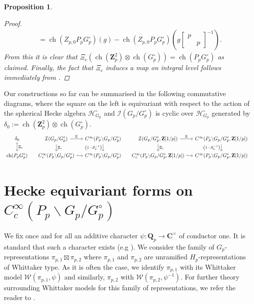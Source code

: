 \documentclass{amsart}%
\theoremstyle{plain}
\newtheorem{prop}[thm]{Proposition}
\theoremstyle{plain}
\theoremstyle{remark}
\DeclareMathOperator{\ch}{ch}
\begin{document}
\begin{prop}
\begin{proof}
\begin{align*}
        &= \ch(Z_{p,0}P_p G_p^\circ)(g)- \ch(Z_{p,0}P_p G_p^\circ)\left(g\left[\begin{smallmatrix}
            p & \\
            & p
        \end{smallmatrix}\right]^{-1}\right).
    \end{align*}
    From this it is clear that $\Xi_c\left(\ch(\mathbf{Z}_p^2)\otimes \ch(G_p^\circ)\right)=\ch(P_pG_p^\circ)$ as claimed. Finally, the fact that $\Xi_c$ induces a map on integral level follows immediately from .
\end{proof}
\end{prop}
\noindent Our constructions so far can be summarised in the following commutative diagrams, where the square on the left is equivariant with respect to the action of the spherical Hecke algebra $\mathcal{H}_{G_p}^\circ$ and $\mathcal{I}(G_p/G_p^\circ)$ is cyclic over $\mathcal{H}_{G_p}^\circ$ generated by $\delta_0:=\ch(\mathbf{Z}_p^2)\otimes \ch(G_p^\circ)$.
\[\begin{tikzcd}[column sep=small,row sep=scriptsize]
	{\delta_0} & {\mathcal{I}(G_p/G_p^\circ)} & {C^\infty(P_p\backslash G_p/G_p^\circ)} & {\mathcal{I}(G_p/G_p^\circ,\mathbf{Z}[1/p])} & {C^\infty(P_p\backslash G_p/G_p^\circ,\mathbf{Z}[1/p])} \\
	{\ch(P_pG_p^\circ)} & {C_c^\infty(P_p\backslash G_p/G_p^\circ)} & {C^\infty(P_p\backslash G_p/G_p^\circ)} & {C_c^\infty(P_p\backslash G_p/G_p^\circ,\mathbf{Z}[1/p])} & {C^\infty(P_p\backslash G_p/G_p^\circ,\mathbf{Z}[1/p])}
	\arrow["{\Xi_c}", maps to, from=1-1, to=2-1]
	\arrow["\Xi", from=1-2, to=1-3]
	\arrow["{\Xi_c}", from=1-2, to=2-2]
	\arrow["{{\cdot\left(1-\mathcal{S}_p^{-1}\right)}}"', from=1-3, to=2-3]
	\arrow["\Xi", from=1-4, to=1-5]
	\arrow["{\Xi_c}", from=1-4, to=2-4]
	\arrow["{{\cdot\left(1-\mathcal{S}_p^{-1}\right)}}"', from=1-5, to=2-5]
	\arrow[hook, from=2-2, to=2-3]
	\arrow[hook, from=2-4, to=2-5]
\end{tikzcd}\]




\section{Hecke equivariant forms on $C_c^\infty(P_p\backslash G_p/G_p^\circ)$}\label{sec Hecke forms}
We fix once and for all an additive character $\psi:\mathbf{Q}_p\rightarrow\mathbf{C}^\times$ of conductor one. It is standard that such a character exists (e.g \cite[\S $7$]{ramakrishnan2013fourier}). We consider the family of $G_p$-representations $\pi_{p,1}\boxtimes \pi_{p,2}$ where $\pi_{p,1}$ and $\pi_{p,2}$ are unramified $H_p$-representations of Whittaker type. As it is often the case, we identify $\pi_{p,1}$ with its Whittaker model $\mathcal{W}(\pi_{p,1},\psi)$ and similarly, $\pi_{p,2}$ with $\mathcal{W}(\pi_{p,2},\psi^{-1})$. For further theory surrounding Whittaker models for this family of representations, we refer the reader to \cite{bump_1997}. 
\end{document}
